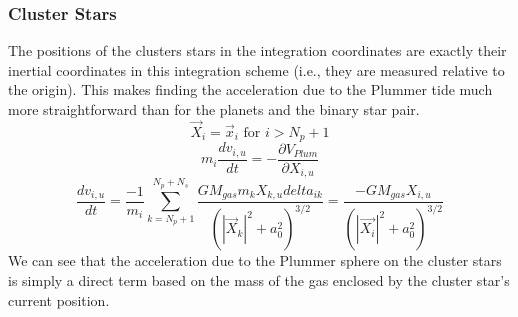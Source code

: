 \documentclass[manuscript]{aastex631}
\begin{document}
\subsubsection{Cluster Stars}
The positions of the clusters stars in the integration coordinates are exactly their inertial coordinates in this integration scheme 
(i.e., they are measured relative to the origin). This makes finding the acceleration due to the Plummer tide much more straightforward 
than for the planets and the binary star pair.
\begin{equation}
    \vec{X}_i = \vec{x}_i \text{  for  } i>N_p+1
\end{equation}
\begin{equation}
    m_i\frac{dv_{i,u}}{dt} = -\frac{\partial V_{Plum}}{\partial X_{i,u}}
\end{equation}
\begin{equation}
    \frac{dv_{i,u}}{dt} = \frac{-1}{m_i}\sum_{k=N_p+1}^{N_p+N_s}\frac{GM_{gas}m_kX_{k,u}delta_{ik}}{(|\vec{X}_k|^2+a_0^2)^{3/2}} = 
    \frac{-GM_{gas}X_{i,u}}{(|\vec{X_i}|^2+a_0^2)^{3/2}}
\end{equation}
We can see that the acceleration due to the Plummer sphere on the cluster stars is simply a direct term based on the mass of the gas 
enclosed by the cluster star's current position.
\end{document}
